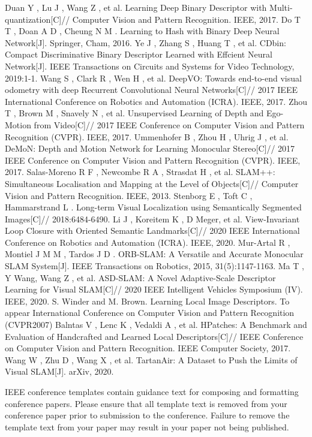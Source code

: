 \documentclass[conference]{IEEEtran}
\begin{document}
\begin{thebibliography}{99}
 Duan Y ,  Lu J ,  Wang Z , et al. Learning Deep Binary Descriptor with Multi-quantization[C]// Computer Vision and Pattern Recognition. IEEE, 2017.
 Do T T ,  Doan A D ,  Cheung N M . Learning to Hash with Binary Deep Neural Network[J]. Springer, Cham, 2016.
 Ye J ,  Zhang S ,  Huang T , et al. CDbin: Compact Discriminative Binary Descriptor Learned with Effcient Neural Network[J]. IEEE Transactions on Circuits and Systems for Video Technology, 2019:1-1.
 Wang S ,  Clark R ,  Wen H , et al. DeepVO: Towards end-to-end visual odometry with deep Recurrent Convolutional Neural Networks[C]// 2017 IEEE International Conference on Robotics and Automation (ICRA). IEEE, 2017.
 Zhou T ,  Brown M ,  Snavely N , et al. Unsupervised Learning of Depth and Ego-Motion from Video[C]// 2017 IEEE Conference on Computer Vision and Pattern Recognition (CVPR). IEEE, 2017.
 Ummenhofer B ,  Zhou H ,  Uhrig J , et al. DeMoN: Depth and Motion Network for Learning Monocular Stereo[C]// 2017 IEEE Conference on Computer Vision and Pattern Recognition (CVPR). IEEE, 2017.
 Salas-Moreno R F ,  Newcombe R A ,  Strasdat H , et al. SLAM++: Simultaneous Localisation and Mapping at the Level of Objects[C]// Computer Vision and Pattern Recognition. IEEE, 2013.
 Stenborg E ,  Toft C ,  Hammarstrand L . Long-term Visual Localization using Semantically Segmented Images[C]// 2018:6484-6490.
 Li J ,  Koreitem K ,  D  Meger, et al. View-Invariant Loop Closure with Oriented Semantic Landmarks[C]// 2020 IEEE International Conference on Robotics and Automation (ICRA). IEEE, 2020.
 Mur-Artal R ,  Montiel J M M ,  Tardos J D . ORB-SLAM: A Versatile and Accurate Monocular SLAM System[J]. IEEE Transactions on Robotics, 2015, 31(5):1147-1163.
 Ma T ,  Y  Wang,  Wang Z , et al. ASD-SLAM: A Novel Adaptive-Scale Descriptor Learning for Visual SLAM[C]// 2020 IEEE Intelligent Vehicles Symposium (IV). IEEE, 2020.
 S. Winder and M. Brown. Learning Local Image Descriptors. To appear International Conference on Computer Vision and Pattern Recognition (CVPR2007)
 Balntas V ,  Lenc K ,  Vedaldi A , et al. HPatches: A Benchmark and Evaluation of Handcrafted and Learned Local Descriptors[C]// IEEE Conference on Computer Vision and Pattern Recognition. IEEE Computer Society, 2017.
 Wang W ,  Zhu D ,  Wang X , et al. TartanAir: A Dataset to Push the Limits of Visual SLAM[J]. arXiv, 2020.

\end{thebibliography}







\vspace{12pt}
\color{red}
IEEE conference templates contain guidance text for composing and formatting conference papers. Please ensure that all template text is removed from your conference paper prior to submission to the conference. Failure to remove the template text from your paper may result in your paper not being published.
\end{document}
